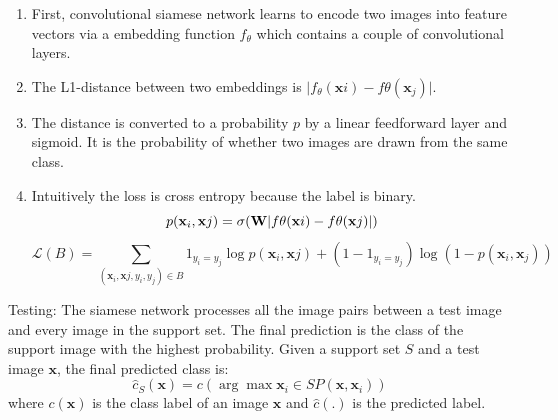 \documentclass[main]{subfiles}
\begin{document}
\begin{enumerate}
    \item First, convolutional siamese network learns to encode two images into feature vectors via a embedding function $f_\theta$ which contains a couple of convolutional layers. 
    \item The L1-distance between two embeddings is $\vert f_\theta(\mathbf{x}i) - f\theta(\mathbf{x}_j) \vert$.
    \item The distance is converted to a probability $p$ by a linear feedforward layer and sigmoid. It is the probability of whether two images are drawn from the same class.
    \item Intuitively the loss is cross entropy because the label is binary. 
    \begin{equation} 
        p(\mathbf{x}_i, \mathbf{x}j) = \sigma(\mathbf{W}\vert f\theta(\mathbf{x}i) - f\theta(\mathbf{x}j) \vert) \\ 
    \end{equation}
    \begin{equation} 
        \mathcal{L}(B) = \sum_{(\mathbf{x}_i, \mathbf{x}j, y_i, y_j)\in B}\mathcal{1}_{y_i=y_j}\log p(\mathbf{x}_i, \mathbf{x}j) + (1-\mathcal{1}_{y_i=y_j})\log (1-p(\mathbf{x}_i, \mathbf{x}_j))
    \end{equation}
\end{enumerate}
Testing: The siamese network processes all the image pairs between a test image and every image in the support set. The final prediction is the class of the support image with the highest probability.
Given a support set $S$ and a test image $\mathbf{x}$, the final predicted class is:
\begin{equation}
   \hat{c}_S(\mathbf{x}) = c(\arg\max{\mathbf{x}_i \in S} P(\mathbf{x}, \mathbf{x}_i)) 
\end{equation}
where $c(\mathbf{x})$ is the class label of an image $\mathbf{x}$ and $\hat{c}(.)$ is the predicted label.
\end{document}
